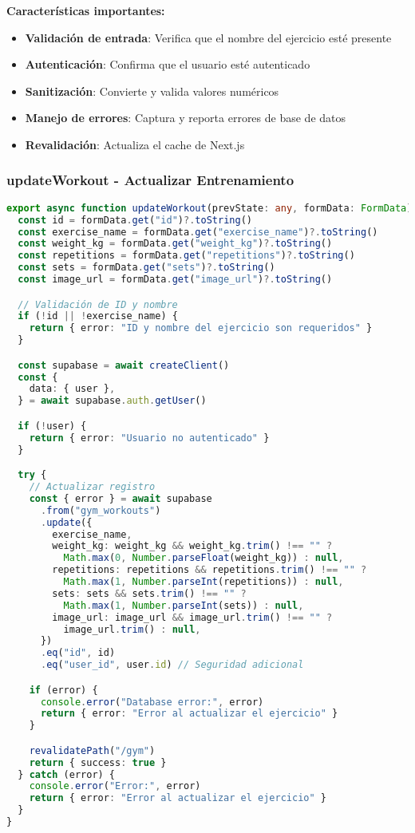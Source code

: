 \documentclass[12pt,a4paper]{article}
\begin{document}
\textbf{Características importantes:}
\begin{itemize}
    \item \textbf{Validación de entrada}: Verifica que el nombre del ejercicio esté presente
    \item \textbf{Autenticación}: Confirma que el usuario esté autenticado
    \item \textbf{Sanitización}: Convierte y valida valores numéricos
    \item \textbf{Manejo de errores}: Captura y reporta errores de base de datos
    \item \textbf{Revalidación}: Actualiza el cache de Next.js
\end{itemize}

\subsubsection{updateWorkout - Actualizar Entrenamiento}

\begin{lstlisting}[language=typescript, caption=Función updateWorkout completa]
export async function updateWorkout(prevState: any, formData: FormData) {
  const id = formData.get("id")?.toString()
  const exercise_name = formData.get("exercise_name")?.toString()
  const weight_kg = formData.get("weight_kg")?.toString()
  const repetitions = formData.get("repetitions")?.toString()
  const sets = formData.get("sets")?.toString()
  const image_url = formData.get("image_url")?.toString()

  // Validación de ID y nombre
  if (!id || !exercise_name) {
    return { error: "ID y nombre del ejercicio son requeridos" }
  }

  const supabase = await createClient()
  const {
    data: { user },
  } = await supabase.auth.getUser()

  if (!user) {
    return { error: "Usuario no autenticado" }
  }

  try {
    // Actualizar registro
    const { error } = await supabase
      .from("gym_workouts")
      .update({
        exercise_name,
        weight_kg: weight_kg && weight_kg.trim() !== "" ? 
          Math.max(0, Number.parseFloat(weight_kg)) : null,
        repetitions: repetitions && repetitions.trim() !== "" ? 
          Math.max(1, Number.parseInt(repetitions)) : null,
        sets: sets && sets.trim() !== "" ? 
          Math.max(1, Number.parseInt(sets)) : null,
        image_url: image_url && image_url.trim() !== "" ? 
          image_url.trim() : null,
      })
      .eq("id", id)
      .eq("user_id", user.id) // Seguridad adicional

    if (error) {
      console.error("Database error:", error)
      return { error: "Error al actualizar el ejercicio" }
    }

    revalidatePath("/gym")
    return { success: true }
  } catch (error) {
    console.error("Error:", error)
    return { error: "Error al actualizar el ejercicio" }
  }
}
\end{lstlisting}
\end{document}

